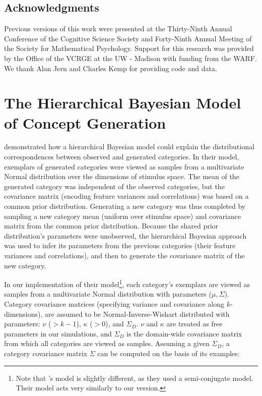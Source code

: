 \documentclass[12pt]{article}
\begin{document}
\begin{flushleft}
\clearpage
\section{Acknowledgments} Previous versions of this work were presented at the
Thirty-Ninth Annual Conference of the Cognitive Science Society and Forty-Ninth
Annual Meeting of the Society for Mathematical Psychology. Support for this
research was provided by the Office of the VCRGE at the UW - Madison with
funding from the WARF. We thank Alan Jern and Charles Kemp for providing code
and data.
\end{flushleft}


\clearpage  
\clearpage


\appendix {}

\section{The Hierarchical Bayesian Model of Concept Generation}
\label{ap:hsampling-definition}

\cite{jern2013probabilistic} demonstrated how a hierarchical Bayesian model
could explain the distributional correspondences between observed and generated
categories. In their model, exemplars of generated categories were viewed as
samples from a multivariate Normal distribution over the dimensions of stimulus
space. The mean of the generated category was independent of the observed
categories, but the covariance matrix (encoding feature variances and
correlations) was based on a common prior distribution. Generating a new
category was thus completed by sampling a new category mean (uniform over
stimulus space) and covariance matrix from the common prior distribution.
Because the shared prior distribution's parameters were unobserved, the
hierarchical Bayesian approach was used to infer its parameters from the
previous categories (their feature variances and correlations), and then to
generate the covariance matrix of the new category.

In our implementation of their model\footnote{Note that
\citet{jern2013probabilistic}'s model is slightly different, as they used a
semi-conjugate model. Their model acts very similarly to our version.}, each
category's exemplars are viewed as samples from a multivariate Normal
distribution with parameters ($\mu, \Sigma$). Category covariance matrices
(specifying variance and covariance along $k$-dimensions), are assumed to be
Normal-Inverse-Wishart distributed with parameters: $\nu$ ($>k-1$), $\kappa$
($>0$), and $\Sigma_D$. $\nu$ and $\kappa$ are treated as free parameters in our
simulations, and $\Sigma_D$ is the domain-wide covariance matrix from which all
categories are viewed as samples. Assuming a given $\Sigma_D$, a category
covariance matrix $\Sigma$ can be computed on the basis of its examples:
\end{document}
